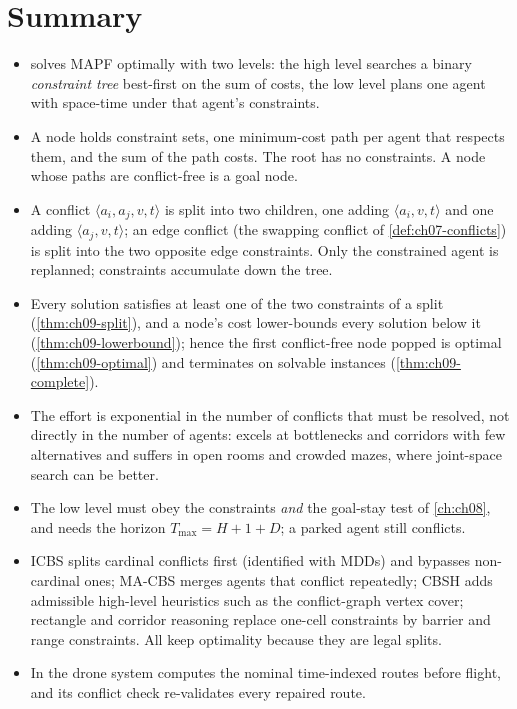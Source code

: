 \section{Summary}
\begin{summary}
\begin{itemize}
  \item \cbs solves MAPF optimally with two levels: the high level searches a binary \emph{constraint tree} best-first on the sum of costs, the low level plans one agent with space-time \astar under that agent's constraints.
  \item A node holds constraint sets, one minimum-cost path per agent that respects them, and the sum of the path costs. The root has no constraints. A node whose paths are conflict-free is a goal node.
  \item A conflict $\langle a_i, a_j, v, t\rangle$ is split into two children, one adding $\langle a_i, v, t\rangle$ and one adding $\langle a_j, v, t\rangle$; an edge conflict (the swapping conflict of \cref{def:ch07-conflicts}) is split into the two opposite edge constraints. Only the constrained agent is replanned; constraints accumulate down the tree.
  \item Every solution satisfies at least one of the two constraints of a split (\cref{thm:ch09-split}), and a node's cost lower-bounds every solution below it (\cref{thm:ch09-lowerbound}); hence the first conflict-free node popped is optimal (\cref{thm:ch09-optimal}) and \cbs terminates on solvable instances (\cref{thm:ch09-complete}).
  \item The effort is exponential in the number of conflicts that must be resolved, not directly in the number of agents: \cbs excels at bottlenecks and corridors with few alternatives and suffers in open rooms and crowded mazes, where joint-space search can be better.
  \item The low level must obey the constraints \emph{and} the goal-stay test of \cref{ch:ch08}, and needs the horizon $T_{\max} = H + 1 + D$; a parked agent still conflicts.
  \item ICBS splits cardinal conflicts first (identified with MDDs) and bypasses non-cardinal ones; MA-CBS merges agents that conflict repeatedly; CBSH adds admissible high-level heuristics such as the conflict-graph vertex cover; rectangle and corridor reasoning replace one-cell constraints by barrier and range constraints. All keep optimality because they are legal splits.
  \item In the drone system \cbs computes the nominal time-indexed routes before flight, and its conflict check re-validates every repaired route.
\end{itemize}
\end{summary}

